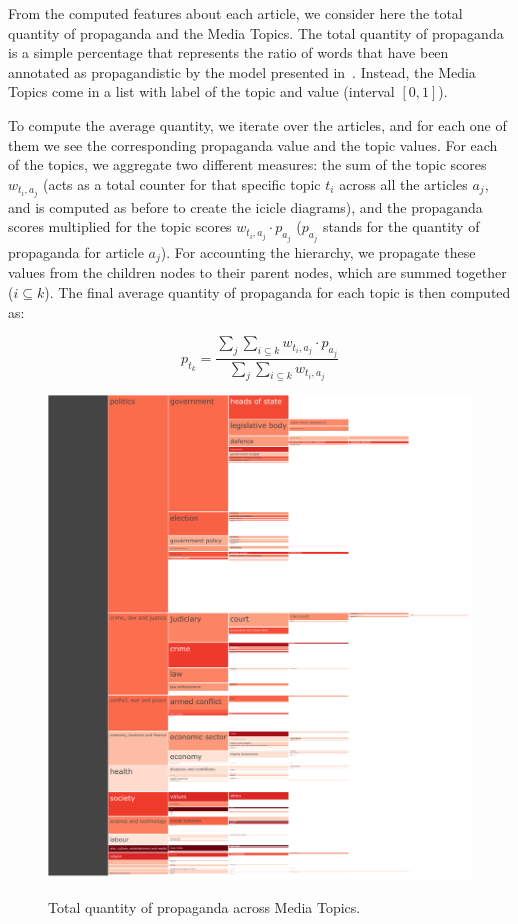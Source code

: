 From the computed features about each article, we consider here the total quantity of propaganda and the Media Topics.
The total quantity of propaganda is a simple percentage that represents the ratio of words that have been annotated as propagandistic by the model presented in~\citet{da2019fine}.
Instead, the Media Topics come in a list with label of the topic and value (interval $[0,1]$).

To compute the average quantity, we iterate over the articles, and for each one of them we see the corresponding propaganda value and the topic values. For each of the topics, we aggregate two different measures: the sum of the topic scores $w_{t_{i},a_{j}}$ (acts as a total counter for that specific topic $t_{i}$ across all the articles $a_{j}$, and is computed as before to create the icicle diagrams), and the propaganda scores multiplied for the topic scores $w_{t_{i},a_{j}} \cdot p_{a_{j}}$ ($p_{a_{j}}$ stands for the quantity of propaganda for article $a_{j}$).
For accounting the hierarchy, we propagate these values from the children nodes to their parent nodes, which are summed together ($i\subseteq k$).
The final average quantity of propaganda for each topic is then computed as:

$$ p_{t_{k}} = \frac{ \sum_{j} \sum_{i\subseteq k} w_{t_{i},a_{j}} \cdot p_{a_{j}} }{ \sum_{j} \sum_{i\subseteq k} w_{t_{i},a_{j}} } $$

\begin{figure}[!htbp]
    \centering
    \href{https://martinomensio.github.io/phd-project/figures/baly_iptc_weighted_prop_total.html}{\includegraphics[trim={2.65cm 0cm 0cm 0cm},clip,width=\linewidth]{figures/baly_iptc_weighted_prop_total.pdf}}
    \caption{Total quantity of propaganda across Media Topics.}
    \label{fig:baly_iptc_weighted_prop_total}
\end{figure}

